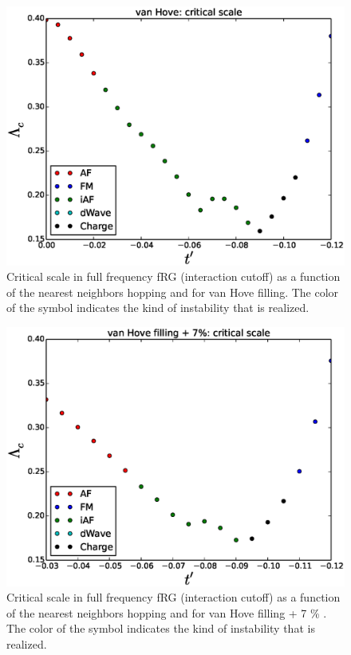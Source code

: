 \begin{figure}
\includegraphics[scale=0.8]{vanHove_scan_critical_lambda_phi.eps}
\caption{Critical scale in full frequency fRG (interaction cutoff) as a function of the nearest neighbors hopping and for van Hove filling. The color of the symbol indicates the kind of instability that is realized.  } \label{phasediag_van_hove}

\end{figure}

\begin{figure}
\includegraphics[scale=0.8]{vanHove_plus_scan_critical_lambda_phi.eps}
\caption{Critical scale in full frequency fRG (interaction cutoff) as a function of the nearest neighbors hopping and for van Hove filling + 7 \% . The color of the symbol indicates the kind of instability that is realized.} 
\label{phasediag_van_hove_plus} 
\end{figure}

